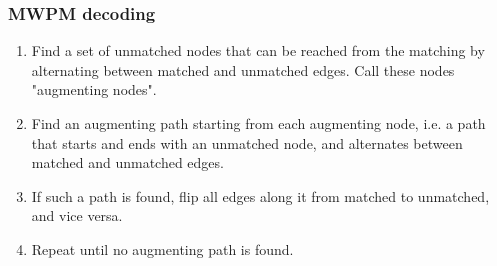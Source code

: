 \subsubsection{MWPM decoding}
\begin{enumerate}
    \item Find a set of unmatched nodes that can be reached from the 
    matching by alternating between matched and unmatched edges. 
    Call these nodes "augmenting nodes".
    \item Find an augmenting path starting from each augmenting node,
    i.e. a path that starts and ends with an unmatched node, and
    alternates between matched and unmatched edges. 
    \item If such a path is found, flip all edges along it from matched
    to unmatched, and vice versa.
    \item Repeat until no augmenting path is found.
\end{enumerate}